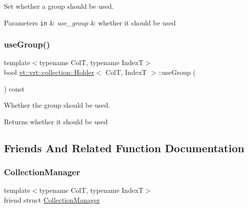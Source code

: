 Set whether a group should be used. 


\begin{DoxyParams}[1]{Parameters}
\mbox{\tt in}  & {\em use\+\_\+group} & whether it should be used \\
\hline
\end{DoxyParams}
\mbox{\label{structvt_1_1vrt_1_1collection_1_1_holder_af9a9e5dbf89d84e9fb4d267f720bfa4e}} 
\subsubsection{\texorpdfstring{use\+Group()}{useGroup()}}
{\footnotesize\ttfamily template$<$typename ColT, typename IndexT$>$ \\
bool \hyperlink{structvt_1_1vrt_1_1collection_1_1_holder}{vt\+::vrt\+::collection\+::\+Holder}$<$ ColT, IndexT $>$\+::use\+Group (\begin{DoxyParamCaption}{ }\end{DoxyParamCaption}) const\hspace{0.3cm}{\ttfamily [inline]}}



Whether the group should be used. 

\begin{DoxyReturn}{Returns}
whether it should be used 
\end{DoxyReturn}


\subsection{Friends And Related Function Documentation}
\mbox{\label{structvt_1_1vrt_1_1collection_1_1_holder_af9288b1963f434a90b307b5305a49510}} 
\subsubsection{\texorpdfstring{Collection\+Manager}{CollectionManager}}
{\footnotesize\ttfamily template$<$typename ColT, typename IndexT$>$ \\
friend struct \hyperlink{structvt_1_1vrt_1_1collection_1_1_collection_manager}{Collection\+Manager}\hspace{0.3cm}{\ttfamily [friend]}}



